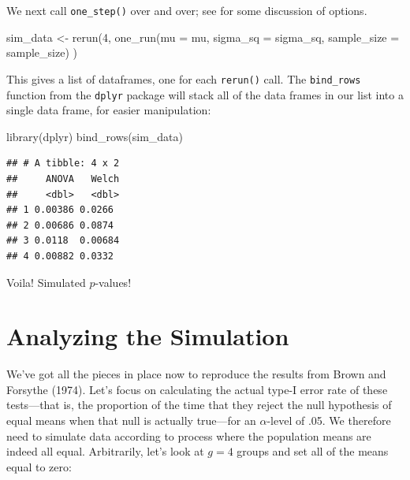 \documentclass[
]{book}
\newenvironment{Shaded}{\begin{snugshade}}{\end{snugshade}}
\newcommand{\AttributeTok}[1]{\textcolor[rgb]{0.77,0.63,0.00}{#1}}
\newcommand{\DecValTok}[1]{\textcolor[rgb]{0.00,0.00,0.81}{#1}}
\newcommand{\FunctionTok}[1]{\textcolor[rgb]{0.00,0.00,0.00}{#1}}
\newcommand{\NormalTok}[1]{#1}
\newcommand{\OtherTok}[1]{\textcolor[rgb]{0.56,0.35,0.01}{#1}}
\begin{document}
We next call \texttt{one\_step()} over and over; see \citet{repeating_oneself} for some discussion of options.

\begin{Shaded}
\begin{Highlighting}[]
\NormalTok{sim\_data }\OtherTok{\textless{}{-}} \FunctionTok{rerun}\NormalTok{(}\DecValTok{4}\NormalTok{,}
                  \FunctionTok{one\_run}\NormalTok{(}\AttributeTok{mu =}\NormalTok{ mu, }\AttributeTok{sigma\_sq =}\NormalTok{ sigma\_sq,}
                          \AttributeTok{sample\_size =}\NormalTok{ sample\_size) )}
\end{Highlighting}
\end{Shaded}

This gives a list of dataframes, one for each \texttt{rerun()} call.
The \texttt{bind\_rows} function from the \texttt{dplyr} package will stack all of the data frames in our list into a single data frame, for easier manipulation:

\begin{Shaded}
\begin{Highlighting}[]
\FunctionTok{library}\NormalTok{(dplyr)}
\FunctionTok{bind\_rows}\NormalTok{(sim\_data)}
\end{Highlighting}
\end{Shaded}

\begin{verbatim}
## # A tibble: 4 x 2
##     ANOVA   Welch
##     <dbl>   <dbl>
## 1 0.00386 0.0266 
## 2 0.00686 0.0874 
## 3 0.0118  0.00684
## 4 0.00882 0.0332
\end{verbatim}

Voila! Simulated \(p\)-values!

\hypertarget{analyzing-the-simulation}{%
\section{Analyzing the Simulation}\label{analyzing-the-simulation}}

We've got all the pieces in place now to reproduce the results from Brown and Forsythe (1974). Let's focus on calculating the actual type-I error rate of these tests---that is, the proportion of the time that they reject the null hypothesis of equal means when that null is actually true---for an \(\alpha\)-level of .05. We therefore need to simulate data according to process where the population means are indeed all equal. Arbitrarily, let's look at \(g = 4\) groups and set all of the means equal to zero:
\end{document}
